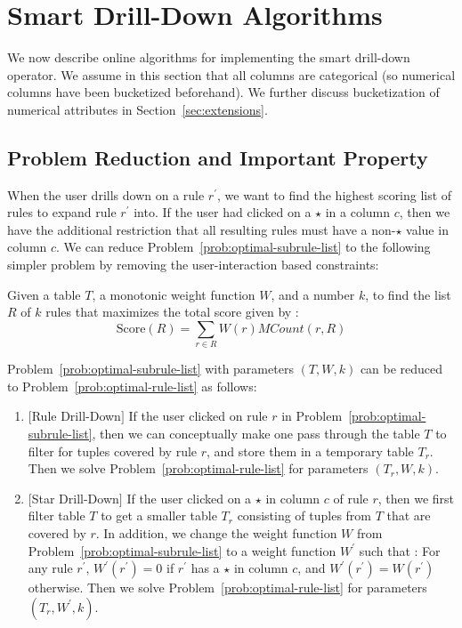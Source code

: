 

\section{Smart Drill-Down Algorithms}
\label{sec:algorithms}
We now describe online algorithms for implementing
the smart drill-down operator. We assume in this section that all columns are categorical (so numerical columns have been bucketized beforehand). We further discuss bucketization of numerical attributes in Section~\ref{sec:extensions}.


\subsection{Problem Reduction and Important Property} \label{sec:reduction}
When the user drills down on a rule $r^{\prime}$, we want to find the highest scoring list of rules to expand rule $r^{\prime}$ into. If the user had clicked on a $\star$ in a column $c$, then we have the additional restriction that all resulting rules must have a non-$\star$ value in column $c$. We can reduce Problem~\ref{prob:optimal-subrule-list} to the following simpler problem by removing the user-interaction based constraints: 

\begin{problem}\label{prob:optimal-rule-list}
Given a table $T$, a monotonic weight function $W$, and a number $k$, to find the list $R$ of $k$ rules that maximizes the total score given by :
$$\text{Score}(R) = \sum_{r \in R}W(r)MCount(r,R)$$
\end{problem}

\noindent Problem~\ref{prob:optimal-subrule-list} with parameters $(T, W, k)$ can be reduced to Problem~\ref{prob:optimal-rule-list} as follows:
\begin{enumerate}
\item $[$Rule Drill-Down$]$ If the user clicked on rule $r$ in Problem~\ref{prob:optimal-subrule-list}, then we can conceptually make one pass through the table $T$ to filter for tuples covered by rule $r$, and store them in a temporary table $T_r$. Then we solve Problem~\ref{prob:optimal-rule-list} for parameters $(T_r, W, k)$.
\item $[$Star Drill-Down$]$ If the user clicked on a $\star$ in column $c$ of rule $r$, then we first filter table $T$ to get a smaller table $T_r$ consisting of tuples from $T$ that are covered by $r$. In addition, we change the weight function $W$ from Problem~\ref{prob:optimal-subrule-list} to a weight function $W^{\prime}$ such that : For any rule $r^{\prime}$, $W^{\prime}(r^{\prime}) = 0$ if $r^{\prime}$ has a $\star$ in column $c$, and $W^{\prime}(r^{\prime}) = W(r^{\prime})$ otherwise. Then we solve Problem~\ref{prob:optimal-rule-list} for parameters $(T_r, W^{\prime}, k)$.
\end{enumerate}


